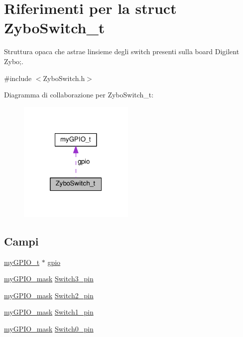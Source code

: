 \hypertarget{struct_zybo_switch__t}{}\section{Riferimenti per la struct Zybo\+Switch\+\_\+t}
\label{struct_zybo_switch__t}


Struttura opaca che astrae l\textquotesingle{}insieme degli switch presenti sulla board Digilent Zybo;.  




{\ttfamily \#include $<$Zybo\+Switch.\+h$>$}



Diagramma di collaborazione per Zybo\+Switch\+\_\+t\+:\nopagebreak
\begin{figure}[H]
\begin{center}
\leavevmode
\includegraphics[width=157pt]{struct_zybo_switch__t__coll__graph}
\end{center}
\end{figure}
\subsection*{Campi}
\begin{DoxyCompactItemize}
\item 
\hyperlink{structmy_g_p_i_o__t}{my\+G\+P\+I\+O\+\_\+t} $\ast$ \hyperlink{struct_zybo_switch__t_ac37ddc7c58d246d233dfb38037020184}{gpio}
\item 
\hyperlink{group__bare-metal_ga402a0d20afc0cb7c25554b8b023f4253}{my\+G\+P\+I\+O\+\_\+mask} \hyperlink{struct_zybo_switch__t_ab2ea73dda75022931396b29e1c377cfb}{Switch3\+\_\+pin}
\item 
\hyperlink{group__bare-metal_ga402a0d20afc0cb7c25554b8b023f4253}{my\+G\+P\+I\+O\+\_\+mask} \hyperlink{struct_zybo_switch__t_aacdefa991c974546015032b1bb95ea1e}{Switch2\+\_\+pin}
\item 
\hyperlink{group__bare-metal_ga402a0d20afc0cb7c25554b8b023f4253}{my\+G\+P\+I\+O\+\_\+mask} \hyperlink{struct_zybo_switch__t_aa031241ea0c12a6f327d3697113e992c}{Switch1\+\_\+pin}
\item 
\hyperlink{group__bare-metal_ga402a0d20afc0cb7c25554b8b023f4253}{my\+G\+P\+I\+O\+\_\+mask} \hyperlink{struct_zybo_switch__t_aa125c82837d72bdb20a0e22f3a86646e}{Switch0\+\_\+pin}
\end{DoxyCompactItemize}


